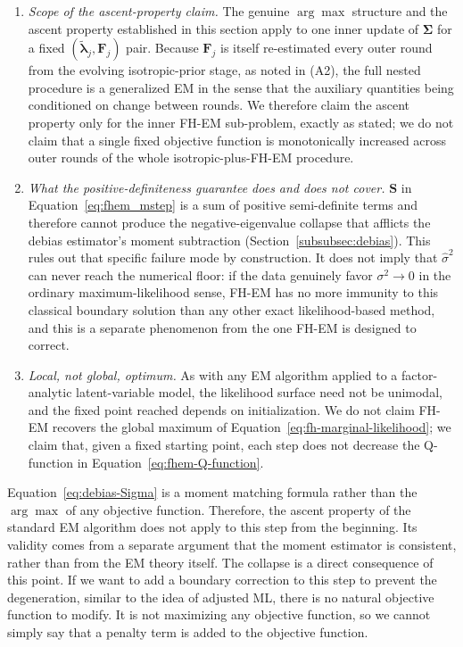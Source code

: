 \begin{enumerate}
\item[(A5)] \emph{Scope of the ascent-property claim.} The genuine $\arg\max$ structure and the ascent property established in this section apply to one inner update of $\bm\Sigma$ for a fixed $(\tilde{\bm\lambda}_j,\mathbf F_j)$ pair. Because $\mathbf F_j$ is itself re-estimated every outer round from the evolving isotropic-prior stage, as noted in (A2), the full nested procedure is a generalized EM in the sense that the auxiliary quantities being conditioned on change between rounds. We therefore claim the ascent property only for the inner FH-EM sub-problem, exactly as stated; we do not claim that a single fixed objective function is monotonically increased across outer rounds of the whole isotropic-plus-FH-EM procedure.

\item[(A6)] \emph{What the positive-definiteness guarantee does and does not cover.} $\mathbf S$ in Equation~\eqref{eq:fhem_mstep} is a sum of positive semi-definite terms and therefore cannot produce the negative-eigenvalue collapse that afflicts the debias estimator's moment subtraction (Section~\ref{subsubsec:debias}). This rules out that specific failure mode by construction. It does not imply that $\hat\sigma^2$ can never reach the numerical floor: if the data genuinely favor $\sigma^2\to0$ in the ordinary maximum-likelihood sense, FH-EM has no more immunity to this classical boundary solution than any other exact likelihood-based method, and this is a separate phenomenon from the one FH-EM is designed to correct.

\item[(A7)] \emph{Local, not global, optimum.} As with any EM algorithm applied to a factor-analytic latent-variable model, the likelihood surface need not be unimodal, and the fixed point reached depends on initialization. We do not claim FH-EM recovers the global maximum of Equation~\eqref{eq:fh-marginal-likelihood}; we claim that, given a fixed starting point, each step does not decrease the Q-function in Equation~\eqref{eq:fhem-Q-function}.
\end{enumerate}

Equation~\eqref{eq:debias-Sigma} is a moment matching formula rather than the $\arg\max$ of any objective function. Therefore, the ascent property of the standard EM algorithm does not apply to this step from the beginning. Its validity comes from a separate argument that the moment estimator is consistent, rather than from the EM theory itself. The collapse is a direct consequence of this point. If we want to add a boundary correction to this step to prevent the degeneration, similar to the idea of adjusted ML, there is no natural objective function to modify. It is not maximizing any objective function, so we cannot simply say that a penalty term is added to the objective function.

